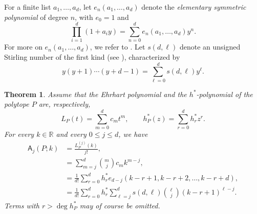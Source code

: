 \documentclass[reqno, 12pt]{article}
\numberwithin{equation}{section}
\newtheorem{theorem}{Theorem}[section]
\theoremstyle{definition}
\newcommand{\R}{\mathbb{R}}
\newcommand{\A}{\mathsf{A}}
\begin{document}
For a finite list $a_1,\ldots,a_d$, let $e_n(a_1,\ldots,a_d)$ denote the \emph{elementary symmetric polynomial} of degree $n$, with $e_0=1$ and
$$\prod_{i=1}^d (1+a_iy)=\sum_{n=0}^{d}e_n(a_1,\ldots,a_d)y^n.$$ 
For more on $e_n(a_1,\ldots,a_d)$, we refer to \cite[Chapter 7]{RP.Stanley99}.
Let $s(d,\ell)$ denote an unsigned Stirling number of the first kind (see \cite[Chapter 1]{RP.Stanley}), characterized by
\begin{equation}\label{eq:stirling-def}
y(y+1)\cdots(y+d-1) =\sum_{\ell=0}^{d}s(d,\ell)y^\ell.
\end{equation}

\begin{theorem}\label{thm:exact-formulas}
Assume that the Ehrhart polynomial and the $h^*$-polynomial of the polytope $P$ are, respectively, 
\[L_P(t)=\sum_{m=0}^{d}c_mt^m,\qquad h_P^*(z)=\sum_{r=0}^{d}h_r^*z^r.
\]
For every $k\in\R$ and every $0\leq j\leq d$, we have 
\begin{align}
 \A_j(P;k) &=\frac{L_P^{(j)}(k)}{j!}, \label{eq:formula-derivative}\\
 &=\sum_{m=j}^{d}\binom{m}{j}c_mk^{m-j}, \label{eq:formula-monomial}\\
 &=\frac1{d!}\sum_{r=0}^{d}h_r^* e_{d-j}(k-r+1,k-r+2,\ldots,k-r+d), \label{eq:formula-elementary}\\
 &=\frac1{d!}\sum_{r=0}^{d}h_r^* \sum_{\ell=j}^{d} s(d,\ell)\binom{\ell}{j} (k-r+1)^{\ell-j}. \label{eq:formula-stirling}
\end{align}
Terms with $r>\deg h_P^*$ may of course be omitted.
\end{theorem}
\end{document}
